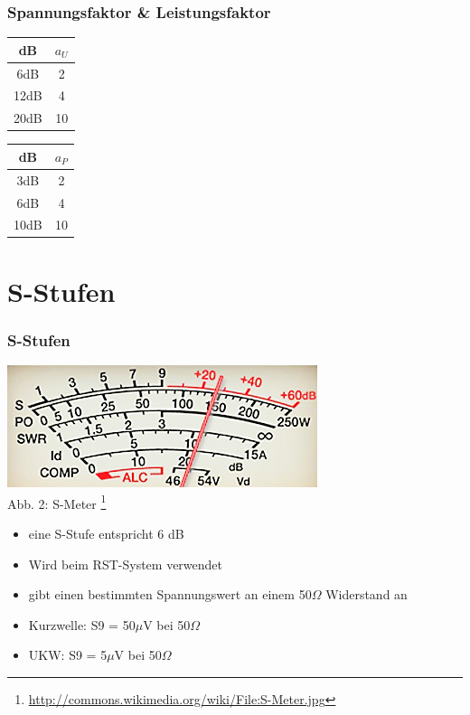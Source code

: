 \begin{frame}
\frametitle{Spannungsfaktor \& Leistungsfaktor}
\begin{center}
\begin{Huge}
\begin{minipage}{0.3\textwidth}
	\begin{tabular}{|c|c|}
		\hline
		dB & $a_{U}$ \\
		\hline \hline
		6dB  & 2  \\ \hline
		12dB & 4  \\ \hline
		20dB & 10 \\ \hline
	\end{tabular}
\end{minipage}
\hspace{2cm}
\begin{minipage}{0.3\textwidth}
	\begin{tabular}{|c|c|}
		\hline
		dB & $a_{P}$ \\
		\hline \hline
		3dB  & 2  \\ \hline
		6dB  & 4  \\ \hline
		10dB & 10 \\ \hline
	\end{tabular}
\end{minipage}
\end{Huge}
\end{center}
\end{frame}

\section*{S-Stufen}
\begin{frame}
\frametitle{S-Stufen}
\begin{center}
\includegraphics[scale=1.2]{e10/S-Meter.jpg}\\
Abb. 2: S-Meter
\footnote{\url{http://commons.wikimedia.org/wiki/File:S-Meter.jpg}}
\begin{itemize}
	\item eine S-Stufe entspricht 6 dB
	\item Wird beim RST-System verwendet
	\item gibt einen bestimmten Spannungswert an einem 50$\Omega$ Widerstand an
	\item Kurzwelle: S9 = 50$\mu$V bei 50$\Omega$
	\item UKW: S9 = 5$\mu$V bei 50$\Omega$
\end{itemize}
\end{center}
\end{frame}

